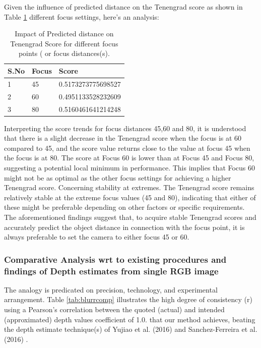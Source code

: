 \documentclass[sn-mathphys]{sn-jnl}%
\theoremstyle{thmstyleone}%
\theoremstyle{thmstyletwo}%
\theoremstyle{thmstylethree}%
\begin{document}
Given the influence of predicted distance on the Tenengrad score  as shown in Table  \ref{tab: Focus-score} different focus settings, here's an analysis:

\begin{table}[!htbp]
\caption{Impact of Predicted distance on Tenengrad Score for different focus points ( or focus distances(s).} 
\label{tab: Focus-score}
\centering 

\begin{tabular}{|l|l|l|}  %
\hline 
S.No & Focus &  Score  \\
\hline 
1 & 45 &  0.5173273775698527 \\
\hline 
2 & 60 & 0.4951133528232609 \\
\hline 
3 & 80 &  0.5160461641214248 \\
\hline 
\end{tabular}
\end{table}

Interpreting the score trends for focus distances 45,60 and 80, it is understood that there is a slight decrease in the Tenengrad score when the focus is at 60 compared to 45, and the score value returns close to the value at focus 45 when the focus is at 80. The score at Focus 60 is lower than at Focus 45 and Focus 80, suggesting a potential local minimum in performance. This implies that Focus 60 might not be as optimal as the other focus settings for achieving a higher Tenengrad score. Concerning stability at extremes. The Tenengrad score remains relatively stable at the extreme focus values (45 and 80), indicating that either of these might be preferable depending on other factors or specific requirements. \\

The aforementioned findings suggest that, to acquire stable Tenengrad scores and accurately predict the object distance in connection with the focus point, it is always preferable to set the camera to either focus 45 or 60.\\

\subsubsection{Comparative Analysis wrt to existing procedures and findings of Depth estimates from single RGB image}
The analogy is predicated on precision, technology, and experimental arrangement. Table \ref{tab:blurrcomp} illustrates the high degree of consistency (r) using a Pearson's correlation between the quoted (actual) and intended (approximated) depth values coefficient of 1.0. that our method achieves, beating the depth estimate technique(s) of Yujiao et al. (2016) \cite{bib4} and Sanchez-Ferreira et al. (2016) \cite{bib5}.
\end{document}
